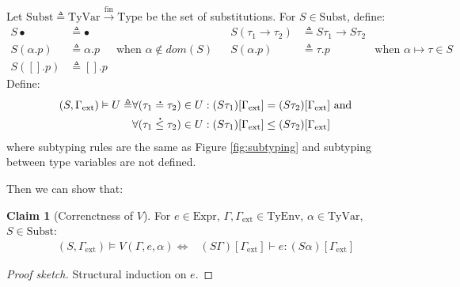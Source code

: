 \documentclass{article}
\theoremstyle{definition}
\newtheorem{clm}{Claim}[section]
\newcommand*{\A}[1]{\overset{\,_{\mbox{\Large .}}}{#1}}
\newcommand*{\Expr}{\text{Expr}}
\newcommand*{\fin}[2]{{#1}\xrightarrow{\text{fin}}{#2}}
\newcommand*{\TyEnv}{\text{TyEnv}}
\newcommand*{\TyVar}{\text{TyVar}}
\newcommand*{\Type}{\text{Type}}
\newcommand*{\Subst}{\text{Subst}}
\newcommand*{\external}{\Gamma_{\text{ext}}}
\begin{document}
Let $\Subst\triangleq\fin{\TyVar}{\Type}$ be the set of substitutions.
For $S\in\Subst$, define:
\begin{align*}
  S\bullet    & \triangleq\bullet  &                                  &  & S(\tau_1\rightarrow\tau_2) & \triangleq S\tau_1\rightarrow S\tau_2                                      \\
  S(\alpha.p) & \triangleq\alpha.p & \text{when }\alpha\not\in dom(S) &  & S(\alpha.p)                & \triangleq \tau.p                     & \text{when }\alpha\mapsto\tau\in S \\
  S([].p)     & \triangleq [].p
\end{align*}
Define:
\begin{align*}
  (S,\external)\vDash U\triangleq & \forall(\tau_1\A{=}\tau_2)\in U:(S\tau_1)[\external]= (S\tau_2)[\external]\text{ and} \\
                                  & \forall(\tau_1\A{\le}\tau_2)\in U:(S\tau_1)[\external]\le(S\tau_2)[\external]
\end{align*}
where subtyping rules are the same as Figure \ref{fig:subtyping} and subtyping between type variables are not defined.

Then we can show that:
\begin{clm}[Correnctness of $V$]
  For $e\in\Expr$, $\Gamma,\external\in\TyEnv$, $\alpha\in\TyVar$, $S\in\Subst$:
  \begin{align*}
    (S,\external)\vDash V(\Gamma,e,\alpha) \Leftrightarrow & (S\Gamma)[\external]\vdash e:(S\alpha)[\external]
  \end{align*}
\end{clm}
\begin{proof}[Proof sketch]
  Structural induction on $e$.
\end{proof}
\end{document}
